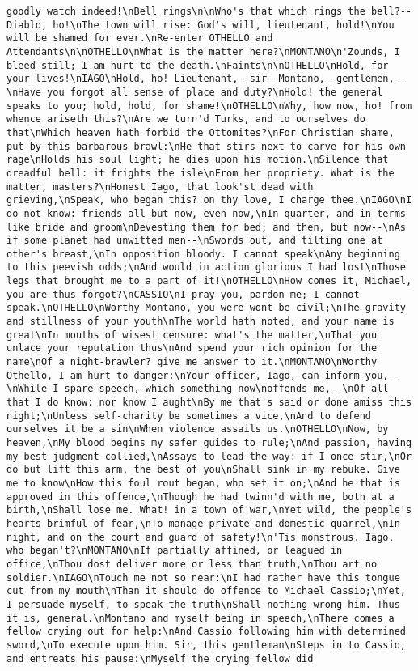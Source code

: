 \begin{verbatim}
goodly watch indeed!\nBell rings\n\nWho's that which rings the bell?--Diablo, ho!\nThe town will rise: God's will, lieutenant, hold!\nYou will be shamed for ever.\nRe-enter OTHELLO and Attendants\n\nOTHELLO\nWhat is the matter here?\nMONTANO\n'Zounds, I bleed still; I am hurt to the death.\nFaints\n\nOTHELLO\nHold, for your lives!\nIAGO\nHold, ho! Lieutenant,--sir--Montano,--gentlemen,--\nHave you forgot all sense of place and duty?\nHold! the general speaks to you; hold, hold, for shame!\nOTHELLO\nWhy, how now, ho! from whence ariseth this?\nAre we turn'd Turks, and to ourselves do that\nWhich heaven hath forbid the Ottomites?\nFor Christian shame, put by this barbarous brawl:\nHe that stirs next to carve for his own rage\nHolds his soul light; he dies upon his motion.\nSilence that dreadful bell: it frights the isle\nFrom her propriety. What is the matter, masters?\nHonest Iago, that look'st dead with grieving,\nSpeak, who began this? on thy love, I charge thee.\nIAGO\nI do not know: friends all but now, even now,\nIn quarter, and in terms like bride and groom\nDevesting them for bed; and then, but now--\nAs if some planet had unwitted men--\nSwords out, and tilting one at other's breast,\nIn opposition bloody. I cannot speak\nAny beginning to this peevish odds;\nAnd would in action glorious I had lost\nThose legs that brought me to a part of it!\nOTHELLO\nHow comes it, Michael, you are thus forgot?\nCASSIO\nI pray you, pardon me; I cannot speak.\nOTHELLO\nWorthy Montano, you were wont be civil;\nThe gravity and stillness of your youth\nThe world hath noted, and your name is great\nIn mouths of wisest censure: what's the matter,\nThat you unlace your reputation thus\nAnd spend your rich opinion for the name\nOf a night-brawler? give me answer to it.\nMONTANO\nWorthy Othello, I am hurt to danger:\nYour officer, Iago, can inform you,--\nWhile I spare speech, which something now\noffends me,--\nOf all that I do know: nor know I aught\nBy me that's said or done amiss this night;\nUnless self-charity be sometimes a vice,\nAnd to defend ourselves it be a sin\nWhen violence assails us.\nOTHELLO\nNow, by heaven,\nMy blood begins my safer guides to rule;\nAnd passion, having my best judgment collied,\nAssays to lead the way: if I once stir,\nOr do but lift this arm, the best of you\nShall sink in my rebuke. Give me to know\nHow this foul rout began, who set it on;\nAnd he that is approved in this offence,\nThough he had twinn'd with me, both at a birth,\nShall lose me. What! in a town of war,\nYet wild, the people's hearts brimful of fear,\nTo manage private and domestic quarrel,\nIn night, and on the court and guard of safety!\n'Tis monstrous. Iago, who began't?\nMONTANO\nIf partially affined, or leagued in office,\nThou dost deliver more or less than truth,\nThou art no soldier.\nIAGO\nTouch me not so near:\nI had rather have this tongue cut from my mouth\nThan it should do offence to Michael Cassio;\nYet, I persuade myself, to speak the truth\nShall nothing wrong him. Thus it is, general.\nMontano and myself being in speech,\nThere comes a fellow crying out for help:\nAnd Cassio following him with determined sword,\nTo execute upon him. Sir, this gentleman\nSteps in to Cassio, and entreats his pause:\nMyself the crying fellow did 
\end{verbatim}
